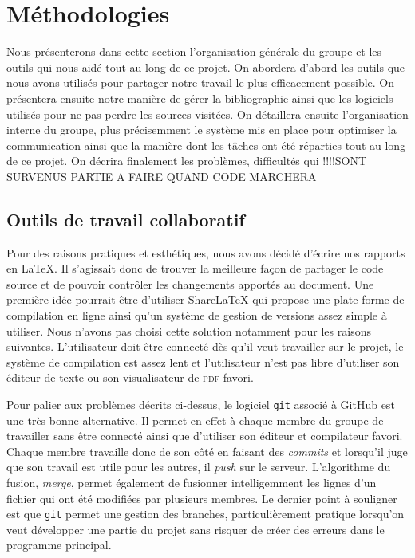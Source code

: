 \section{Méthodologies}
Nous présenterons dans cette section l'organisation générale du groupe et les outils qui nous aidé tout au long de ce projet.
On abordera d'abord les outils que nous avons utilisés pour partager 
notre travail le plus efficacement possible.
On présentera ensuite notre manière de gérer la bibliographie
ainsi que les logiciels utilisés pour ne pas perdre les sources visitées.
On détaillera ensuite l'organisation interne du groupe,
plus précisemment le système mis en place pour optimiser la communication
ainsi que la manière dont les tâches ont été réparties tout au long de ce projet.
On décrira finalement les problèmes, difficultés qui
!!!!SONT SURVENUS PARTIE A FAIRE QUAND CODE MARCHERA


\subsection{Outils de travail collaboratif}
Pour des raisons pratiques et esthétiques, nous avons décidé d'écrire
nos rapports en \LaTeX{}.
Il s'agissait donc de trouver la meilleure façon de partager le code source
et de pouvoir contrôler les changements apportés au document.
Une première idée pourrait être d'utiliser ShareLaTeX qui propose une plate-forme
de compilation en ligne ainsi qu'un système de gestion de versions
assez simple à utiliser.
Nous n'avons pas choisi cette solution notamment pour les raisons suivantes.
L'utilisateur doit être connecté dès qu'il veut travailler sur le projet,
le système de compilation est assez lent et l'utilisateur n'est pas libre
d'utiliser son éditeur de texte ou son visualisateur de \textsc{pdf} favori.

Pour palier aux problèmes décrits ci-dessus, le logiciel \texttt{git}
associé à GitHub est une très bonne alternative.
Il permet en effet à chaque membre du groupe de travailler sans être connecté
ainsi que d'utiliser son éditeur et compilateur favori.
Chaque membre travaille donc de son côté en faisant des \emph{commits}
et lorsqu'il juge que son travail est utile pour les autres, 
il \emph{push} sur le serveur.
L'algorithme du fusion, \emph{merge}, permet également de fusionner intelligemment
les lignes d'un fichier qui ont été modifiées par plusieurs membres.
Le dernier point à souligner est que \texttt{git} permet une gestion des branches,
particulièrement pratique lorsqu'on veut développer une partie du projet
sans risquer de créer des erreurs dans le programme principal.

